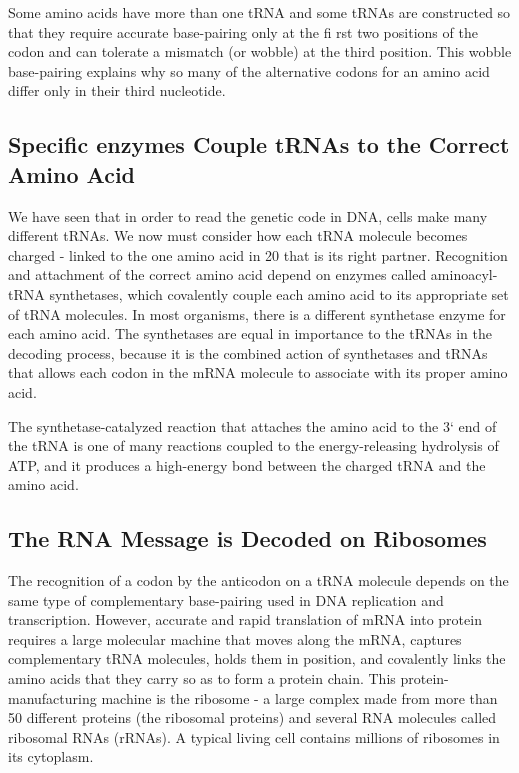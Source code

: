 Some amino acids have more than one tRNA and some tRNAs are constructed so that
they require accurate base-pairing only at the fi rst two positions of the
codon and can tolerate a mismatch (or wobble) at the third position. This
wobble base-pairing explains why so many of the alternative codons
for an amino acid differ only in their third nucleotide.

\subsection{Specific enzymes Couple tRNAs to the Correct Amino Acid}

We have seen that in order to read the genetic code in DNA, cells make
many different tRNAs. We now must consider how each tRNA molecule
becomes charged - linked to the one amino acid in 20 that is its right partner.
Recognition and attachment of the correct amino acid depend on
enzymes called aminoacyl-tRNA synthetases, which covalently couple
each amino acid to its appropriate set of tRNA molecules. In most organisms,
there is a different synthetase enzyme for each amino acid. The
synthetases are equal in importance to the tRNAs in the decoding process,
because it is the combined action of synthetases and tRNAs that
allows each codon in the mRNA molecule to associate with its proper
amino acid.

The synthetase-catalyzed reaction that attaches the amino acid to the 3`
end of the tRNA is one of many reactions coupled to the energy-releasing
hydrolysis of ATP, and it produces a high-energy bond
between the charged tRNA and the amino acid.

\subsection{The RNA Message is Decoded on Ribosomes}

The recognition of a codon by the anticodon on a tRNA molecule depends
on the same type of complementary base-pairing used in DNA replication
and transcription. However, accurate and rapid translation of mRNA
into protein requires a large molecular machine that moves along the
mRNA, captures complementary tRNA molecules, holds them in position,
and covalently links the amino acids that they carry so as to form a
protein chain. This protein-manufacturing machine is the ribosome - a
large complex made from more than 50 different proteins (the ribosomal
proteins) and several RNA molecules called ribosomal RNAs (rRNAs). A
typical living cell contains millions of ribosomes in its cytoplasm.

